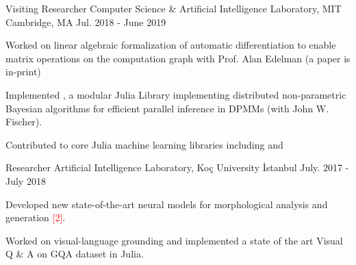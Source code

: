 \begin{cventries}
  \cventry
    {Visiting Researcher} %
    {Computer Science \& Artificial Intelligence Laboratory, MIT} %
    {Cambridge, MA} %
    {Jul. 2018 - June 2019} %
    {
      \begin{cvitems} %
        \item {Worked on linear algebraic formalization of automatic differentiation to enable matrix operations on the computation graph with Prof. Alan Edelman (a paper is in-print)}
        \item{Implemented , a modular Julia Library implementing distributed non-parametric Bayesian algorithms for efficient parallel inference in DPMMs (with John W. Fischer).}
        \item {Contributed to core Julia machine learning libraries including  and  }
      \end{cvitems}
    }

  \cventry
    {Researcher} %
    {Artificial Intelligence Laboratory, Koç University } %
    {İstanbul} %
    {July. 2017 - July 2018} %
    {
      \begin{cvitems} %
        \item{Developed new state-of-the-art neural models for morphological analysis and generation \textcolor{red}{[2]}.}
        \item{Worked on visual-language grounding and implemented a state of the art Visual Q \& A  on GQA dataset in Julia.}
      \end{cvitems}
    }


\end{cventries}
